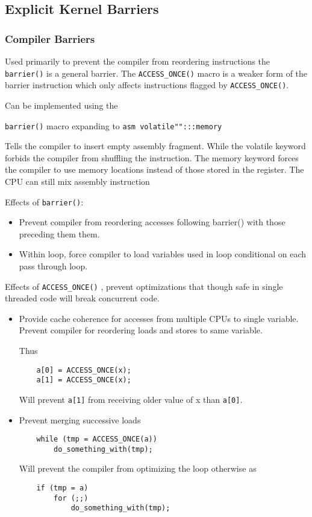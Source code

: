 \documentclass{article}
\begin{document}
\subsection{Explicit Kernel Barriers}

\subsubsection{Compiler Barriers}

Used primarily to prevent the compiler from reordering instructions
the \lstinline{barrier()} is a general barrier. The
\lstinline{ACCESS_ONCE()} macro is a weaker form of the barrier
instruction which only affects instructions flagged by
\lstinline{ACCESS_ONCE()}.

Can be implemented using the

\lstinline{barrier()} macro expanding to \lstinline{asm volatile"":::memory}

Tells the compiler to insert empty assembly fragment. While the
volatile keyword forbids the compiler from shuffling the instruction.
The memory keyword forces the compiler to use memory locations instead
of those stored in the register. The CPU can still mix assembly
instruction

Effects of \lstinline{barrier()}:

\begin{itemize}
  \item Prevent compiler from reordering accesses following barrier()
    with those preceding them them.

  \item Within loop, force compiler to load variables used in loop
    conditional on each pass through loop.    
\end{itemize}

Effects of \lstinline{ACCESS_ONCE()} , prevent optimizations that
though safe in single threaded code will break concurrent code.


\begin{itemize}
\item Provide cache coherence for accesses from multiple CPUs to
  single variable. Prevent compiler for reordering loads and stores to
  same variable.
  
  Thus
  \begin{lstlisting}
    a[0] = ACCESS_ONCE(x);
    a[1] = ACCESS_ONCE(x);
  \end{lstlisting}
  Will prevent \lstinline{a[1]} from receiving older value of x than
  \lstinline{a[0]}.

\item Prevent merging successive loads

  \begin{lstlisting}
    while (tmp = ACCESS_ONCE(a))
		do_something_with(tmp);
  \end{lstlisting}

  Will prevent the compiler from optimizing the loop otherwise as

  \begin{lstlisting}    
	if (tmp = a)
		for (;;)
			do_something_with(tmp);
  \end{lstlisting}


\end{itemize}
\end{document}
